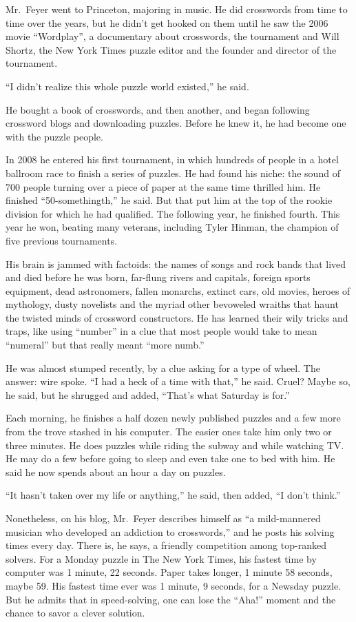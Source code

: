 ﻿\documentclass[12pt]{article}
\begin{document}
Mr.~Feyer went to Princeton, majoring in music. He did crosswords from time to time over the years,
but he didn't get hooked on them until he saw the 2006 movie ``Wordplay'', a documentary about
crosswords, the tournament and Will Shortz, the New York Times puzzle editor and the founder and
director of the tournament.

``I didn't realize this whole puzzle world existed,'' he said.

He bought a book of crosswords, and then another, and began following crossword blogs and
downloading puzzles. Before he knew it, he had become one with the puzzle people.

In 2008 he entered his first tournament, in which hundreds of people in a hotel ballroom race to
finish a series of puzzles. He had found his niche: the sound of 700 people turning over a piece of
paper at the same time thrilled him. He finished ``50-somethingth,'' he said. But that put him at
the top of the rookie division for which he had qualified. The following year, he finished fourth.
This year he won, beating many veterans, including Tyler Hinman, the champion of five previous
tournaments.

His brain is jammed with factoids: the names of songs and rock bands that lived and died before he
was born, far-flung rivers and capitals, foreign sports equipment, dead astronomers, fallen
monarchs, extinct cars, old movies, heroes of mythology, dusty novelists and the myriad other
bevoweled wraiths that haunt the twisted minds of crossword constructors. He has learned their wily
tricks and traps, like using ``number'' in a clue that most people would take to mean ``numeral''
but that really meant ``more numb.''

He was almost stumped recently, by a clue asking for a type of wheel. The answer: wire spoke. ``I
had a heck of a time with that,'' he said. Cruel? Maybe so, he said, but he shrugged and added,
``That's what Saturday is for.''

Each morning, he finishes a half dozen newly published puzzles and a few more from the trove stashed
in his computer. The easier ones take him only two or three minutes. He does puzzles while riding
the subway and while watching TV. He may do a few before going to sleep and even take one to bed
with him. He said he now spends about an hour a day on puzzles.

``It hasn't taken over my life or anything,'' he said, then added, ``I don't think.''

Nonetheless, on his blog, Mr.~Feyer describes himself as ``a mild-mannered musician who developed an
addiction to crosswords,'' and he posts his solving times every day. There is, he says, a friendly
competition among top-ranked solvers. For a Monday puzzle in The New York Times, his fastest time by
computer was 1 minute, 22 seconds. Paper takes longer, 1 minute 58 seconds, maybe 59. His fastest
time ever was 1 minute, 9 seconds, for a Newsday puzzle. But he admits that in speed-solving, one
can lose the ``Aha!'' moment and the chance to savor a clever solution.
\end{document}

